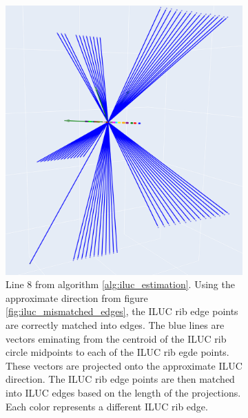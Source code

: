 \begin{figure}[H]
\begin{subfigure}[c]{0.45\textwidth}
        \includegraphics[width=\textwidth]{images/ILUC_center_direction_projections.png}
        \caption{Line 8 from algorithm \ref{alg:iluc_estimation}. Using the approximate direction from figure \ref{fig:iluc_mismatched_edges}, the ILUC rib edge points are correctly matched into edges. The blue lines are vectors eminating from the centroid of the ILUC rib circle midpoints to each of the ILUC rib egde points. These vectors are projected onto the approximate ILUC direction. The ILUC rib edge points are then matched into ILUC edges based on the length of the projections. Each color represents a different ILUC rib edge.}
        \label{fig:iluc_center_direction_projections}
    \end{subfigure}
    \begin{subfigure}[c]{0.45\textwidth}

\end{subfigure}
\end{figure}
